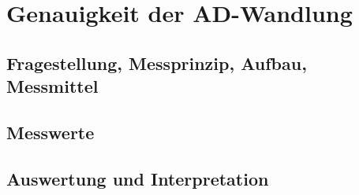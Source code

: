 %
%
\chapter{Genauigkeit der AD-Wandlung}

\label{chap:VERSUCH_2}

\section{Fragestellung, Messprinzip, Aufbau, Messmittel}
\label{chap:VERSUCH_2_FRAGESTELLUNG}

\section{Messwerte}
\label{chap:VERSUCH_2_MESSWERTE}

\section{Auswertung und Interpretation}
\label{chap:AUSWERTUNGUNDINTERPRETATION}




